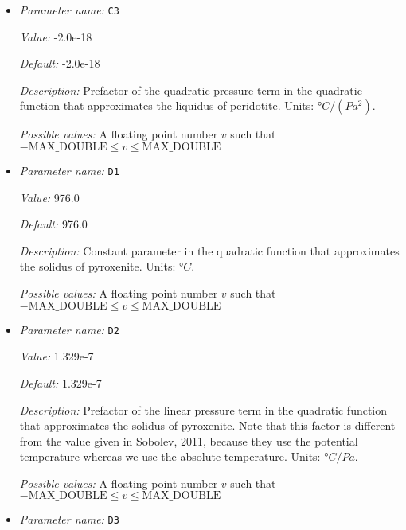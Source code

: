 \begin{itemize}
{\it Default:} 4.50e-8


{\it Description:} Prefactor of the linear pressure term in the quadratic function that approximates the liquidus of peridotite. Units: $°C/Pa$.


{\it Possible values:} A floating point number $v$ such that $-\text{MAX\_DOUBLE} \leq v \leq \text{MAX\_DOUBLE}$
\item {\it Parameter name:} {\tt C3}
\label{parameters:Postprocess/Visualization/Melt fraction/C3}


{\it Value:} -2.0e-18


{\it Default:} -2.0e-18


{\it Description:} Prefactor of the quadratic pressure term in the quadratic function that approximates the liquidus of peridotite. Units: $°C/(Pa^2)$.


{\it Possible values:} A floating point number $v$ such that $-\text{MAX\_DOUBLE} \leq v \leq \text{MAX\_DOUBLE}$
\item {\it Parameter name:} {\tt D1}
\label{parameters:Postprocess/Visualization/Melt fraction/D1}


{\it Value:} 976.0


{\it Default:} 976.0


{\it Description:} Constant parameter in the quadratic function that approximates the solidus of pyroxenite. Units: $°C$.


{\it Possible values:} A floating point number $v$ such that $-\text{MAX\_DOUBLE} \leq v \leq \text{MAX\_DOUBLE}$
\item {\it Parameter name:} {\tt D2}
\label{parameters:Postprocess/Visualization/Melt fraction/D2}


{\it Value:} 1.329e-7


{\it Default:} 1.329e-7


{\it Description:} Prefactor of the linear pressure term in the quadratic function that approximates the solidus of pyroxenite. Note that this factor is different from the value given in Sobolev, 2011, because they use the potential temperature whereas we use the absolute temperature. Units: $°C/Pa$.


{\it Possible values:} A floating point number $v$ such that $-\text{MAX\_DOUBLE} \leq v \leq \text{MAX\_DOUBLE}$
\item {\it Parameter name:} {\tt D3}
\label{parameters:Postprocess/Visualization/Melt fraction/D3}



\end{itemize}
